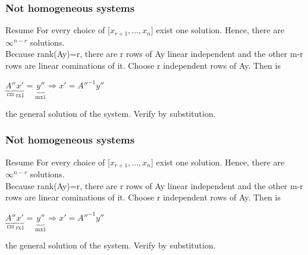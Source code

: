 \begin{frame}
	\frametitle{Not homogeneous systems}
	\begin{block}{Resume}
		For every choice of [$x_{r+1},...,x_n$] exist one solution. Hence, there are $\infty^{n-r}$ solutions.\\
		Because rank(Ay)=r, there are r rows of Ay linear independent and the other m-r rows are linear cominations of it. Choose r independent rows of Ay. Then is
		\begin{center}
			$\underbrace{A''}_\text{rxr}\underbrace{x'}_\text{rx1}=\underbrace{y''}_\text{mx1} \Rightarrow x'=A''^{-1}y''$
		\end{center}
		the general solution of the system. Verify by substitution.
	\end{block}
\end{frame}

\begin{frame}
	\frametitle{Not homogeneous systems}
	\begin{block}{Resume}
		For every choice of [$x_{r+1},...,x_n$] exist one solution. Hence, there are $\infty^{n-r}$ solutions.\\
		Because rank(Ay)=r, there are r rows of Ay linear independent and the other m-r rows are linear cominations of it. Choose r independent rows of Ay. Then is
		\begin{center}
			$\underbrace{A''}_\text{rxr}\underbrace{x'}_\text{rx1}=\underbrace{y''}_\text{mx1} \Rightarrow x'=A''^{-1}y''$
		\end{center}
		the general solution of the system. Verify by substitution.
	\end{block}
\end{frame}

